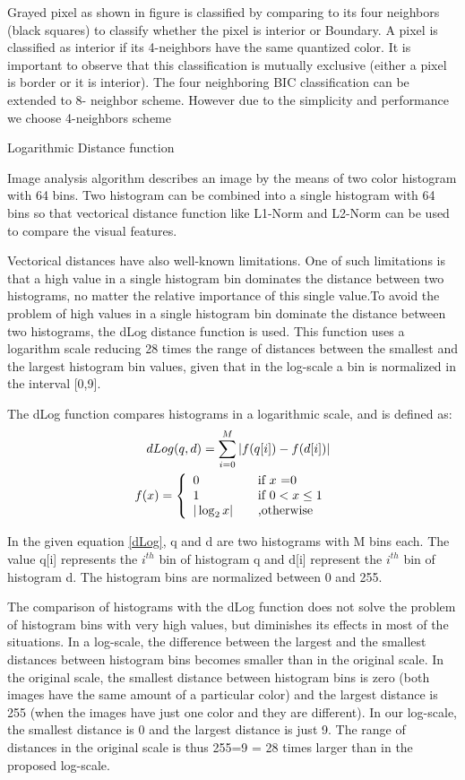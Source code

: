 Grayed pixel as shown in figure is classified by comparing to its four neighbors (black squares)
 to classify whether the pixel is interior or Boundary. A pixel is classified as interior if its 
 4-neighbors have the same quantized color. It is important to observe that this classification is 
 mutually exclusive (either a pixel is border or it is interior). The four neighboring BIC 
 classification can be extended to 8- neighbor scheme. However due to the simplicity and performance 
 we choose 4-neighbors scheme 
 

Logarithmic Distance function

Image analysis algorithm describes an image by the means of two color histogram with 64 bins. Two histogram can be combined into a single histogram with 64 bins so that vectorical distance function like L1-Norm and L2-Norm can be used to compare the visual features.

Vectorical distances have also well-known limitations. One of such limitations is that a high value in a single histogram bin dominates the distance between two histograms, no matter the relative importance of this single value.To avoid the problem of high values in a single histogram bin dominate the distance between two histograms, the dLog distance function is used. This function uses a logarithm scale reducing 28 times the range of distances between the smallest and the largest histogram bin values, given that in the log-scale a bin is normalized in the interval [0,9].

The dLog function compares histograms in a logarithmic scale, and is defined as:
\begin{align}
dLog(q,d) = \sum_{i=0}^M |f(q[i])- f(d[i])|\label{dLog}   \\
f(x)= \left\{ 
\begin{array}{l l}
  0 & \quad \mbox{if $x$ =0}\\
  1 & \quad \text {if } 0< x \le 1\\ 
  |\log_{2}{x}| & \quad \text{,otherwise} \\
\end{array} \right.
\end{align}

In the given equation \ref{dLog}, q and d are two histograms with M bins each. The value q[i] represents the $ i^{th}$ bin of histogram q and d[i] represent the $i^{th}$ bin of histogram d. The histogram bins are normalized between 0 and 255.

 

The comparison of histograms with the dLog function does not solve the problem of histogram bins with very high values, but diminishes its effects in most of the situations. In a log-scale, the difference between the largest and the smallest distances between histogram bins becomes smaller than in the original scale. In the original scale, the smallest distance between histogram bins is zero (both images have the same amount of a particular color) and the largest distance is 255 (when the images have just one color and they are different). In our log-scale, the smallest distance is 0 and the largest distance is just 9. The range of distances in the original scale is thus 255=9 = 28 times larger than in the proposed log-scale.

